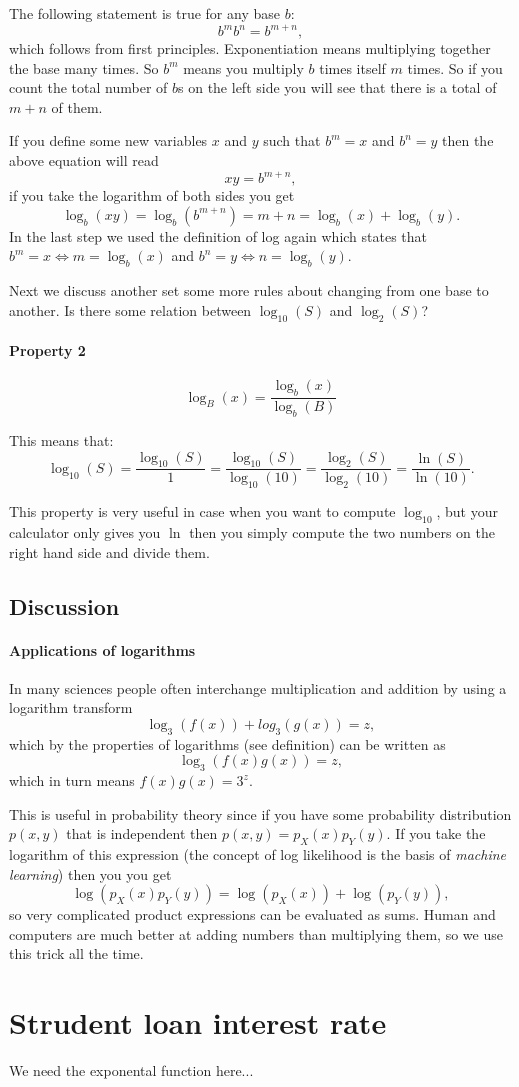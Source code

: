 \documentclass[journal]{IEEEtran}
\newcommand{\dokutitleleveltree}[1]{\subsection{#1}}
\newcommand{\dokutitlelevelfive}[1]{\paragraph{#1}}
\newcommand{\dokuitalic}[1]{\textsl{#1}}
\begin{document}
The following statement is true for any base \(b\):
\[
   b^m b^n = b^{m+n},
\]
which follows from first principles. 
Exponentiation means multiplying together the base many times.
So \(b^m\) means you multiply \(b\) times itself \(m\) times. So if you
count the total number of \(b\)s on the left side you will see that
there is a total of \(m+n\) of them.

If you define some new variables \(x\) and \(y\) such that
\(b^m=x\) and \(b^n=y\) then the above equation will read 
\[
  xy = b^{m+n},
\]
if you take the logarithm of both sides you get
\[
  \log_b(xy) = \log_b\left(  b^{m+n} \right) = m + n = \log_b(x) + \log_b(y).
\]
In the last step we used the definition of log again which
states that \(b^m=x \Leftrightarrow m=\log_b(x)\) and \(b^n=y \Leftrightarrow n=\log_b(y)\).


Next we discuss another set some more rules about changing from
one base to another. 
Is there some relation between \(\log_{10}(S)\) and \(\log_2(S)\)?


\dokutitlelevelfive{Property 2}

\[
  \log_{B}(x) =  \frac{\log_b(x)}{\log_b(B)}
\]




This means that:
\[
 \log_{10}(S) 
 =\frac{\log_{10}(S)}{1}
 =\frac{\log_{10}(S)}{\log_{10}(10)} 
 = \frac{\log_{2}(S)}{\log_{2}(10)}=\frac{\ln(S)}{\ln(10)}.
\]

This property is very useful in case when you want to compute 
\(\log_{10}\), but your calculator only gives you \(\ln\) then you simply compute the 
two numbers on the right hand side and divide them.


\dokutitleleveltree{Discussion}
\label{bd8bc36eb41bc90c585ae7e902e9e284}%

\dokutitlelevelfive{Applications of logarithms}

In many sciences people often interchange multiplication and addition 
by using a logarithm transform
\[
  \log_3(f(x)) + log_3(g(x)) = z,
\]
which by the properties of logarithms (see definition) can be written as  
\[
  \log_3(f(x)g(x)) = z,
\]
which in turn means \(f(x)g(x)=3^z\).

This is useful in probability theory since if you have some probability distribution \(p(x,y)\) that is independent then \(p(x,y)=p_X(x)p_Y(y)\). If you take the logarithm of this expression (the concept of log likelihood is the basis of \dokuitalic{machine learning}) then you
you get
\[
  \log(p_X(x)p_Y(y)) = \log(p_X(x)) + \log(p_Y(y)),
\]
so very complicated product expressions can be evaluated as sums.
Human and computers are much better at adding numbers 
than multiplying them, so we use this trick all the time.




\section{Strudent loan interest rate}

We need the exponental function here...






%
%
\end{document}
